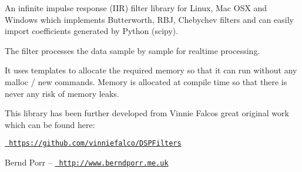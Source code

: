 \label{index_md_doxy}%
%
 An infinite impulse response (IIR) filter library for Linux, Mac OSX and Windows which implements Butterworth, RBJ, Chebychev filters and can easily import coefficients generated by Python (scipy).

The filter processes the data sample by sample for realtime processing.

It uses templates to allocate the required memory so that it can run without any malloc / new commands. Memory is allocated at compile time so that there is never any risk of memory leaks.

This library has been further developed from Vinnie Falco\textquotesingle{}s great original work which can be found here\+:

\href{https://github.com/vinniefalco/DSPFilters}{\texttt{ https\+://github.\+com/vinniefalco/\+DSPFilters}}

Bernd Porr -- \href{http://www.berndporr.me.uk}{\texttt{ http\+://www.\+berndporr.\+me.\+uk}} 